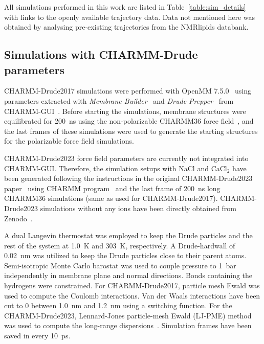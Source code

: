\documentclass[journal=jacsat,manuscript=article,layout=singlecolumn]{achemso}
\begin{document}
All simulations performed in this work are listed in Table~\ref{table:sim_details} with links to the openly available trajectory data. Data not mentioned here was obtained by analysing pre-existing trajectories from the NMRlipids databank.

\subsection{Simulations with CHARMM-Drude parameters}


CHARMM-Drude2017 simulations were performed with OpenMM 7.5.0~\cite{eastman2017openmm} using parameters extracted with \textit{Membrane Builder}~\cite{wu2014charmm,jo2009charmm,jo2007automated,lee2018charmm} and \textit{Drude Prepper}~\cite{kognole2022charmm} from CHARMM-GUI~\cite{jo2008charmm,lee2016charmm}. Before starting the simulations, membrane structures were equilibrated for 200~ns using the non-polarizable CHARMM36 force field~\cite{klauda2010update}, and the last frames of these simulations were used to generate the starting structures for the polarizable force field simulations.

CHARMM-Drude2023 force field parameters are currently not integrated into CHARMM-GUI. Therefore, the simulation setups with NaCl and CaCl$_{2}$ have been generated following the instructions in the original CHARMM-Drude2023 paper~\cite{yu2023drude} using CHARMM program~\cite{brooks2009charmm} and the last frame of 200~ns long CHARMM36 simulations (same as used for CHARMM-Drude2017). CHARMM-Drude2023 simulations without any ions have been directly obtained from Zenodo~\cite{richard_m_venable_2023_7872447, richard_m_venable_2023_7871949}. 

A dual Langevin thermostat was employed to keep the Drude particles and the rest of the system at 1.0~K and 303~K, respectively. A Drude-hardwall of 0.02~nm was utilized to keep the Drude particles close to their parent atoms. Semi-isotropic Monte Carlo barostat was used to couple pressure to 1~bar independently in membrane plane and normal directions. %
Bonds containing the hydrogens were constrained. For CHARMM-Drude2017, particle mesh Ewald was used to compute the Coulomb interactions. Van der Waals interactions have been cut to 0 between 1.0~nm and 1.2~nm using a switching function. For the CHARMM-Drude2023, Lennard-Jones particle-mesh Ewald (LJ-PME) method was used to compute the long-range dispersions~\cite{wennberg2013lennard}. Simulation frames have been saved in every 10~ps.
\end{document}
